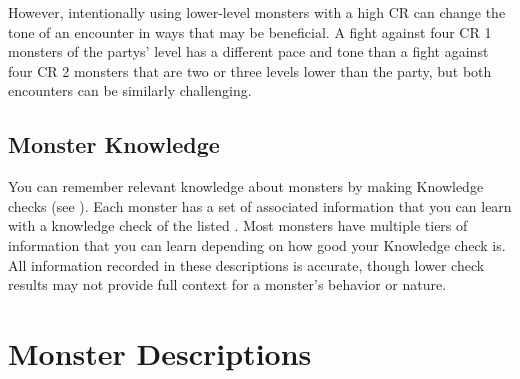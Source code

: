         However, intentionally using lower-level monsters with a high CR can change the tone of an encounter in ways that may be beneficial.
        A fight against four CR 1 monsters of the partys' level has a different pace and tone than a fight against four CR 2 monsters that are two or three levels lower than the party, but both encounters can be similarly challenging.

    \subsection{Monster Knowledge}
        You can remember relevant knowledge about monsters by making Knowledge checks (see ).
        Each monster has a set of associated information that you can learn with a knowledge check of the listed .
        Most monsters have multiple tiers of information that you can learn depending on how good your Knowledge check is.
        All information recorded in these descriptions is accurate, though lower check results may not provide full context for a monster's behavior or nature.

\section{Monster Descriptions}


